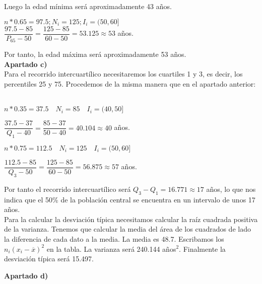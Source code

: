 Luego la edad mínima será aproximadamente 43 años.

\begin{center}
	$n*0.65 = 97.5; N_i = 125 ; I_i = (50, 60]$\\
	$\dfrac{97.5-85}{P_{65}-50} = \dfrac{125-85}{60-50} = 53.125
	\approx 53$ años.
\end{center}

Por tanto, la edad máxima será aproximadamente 53 años.\\


\textbf{Apartado c)}\\

Para el recorrido intercuartílico necesitaremos los cuartiles 1 y 3, es decir, los percentiles 25 y 75. Procedemos de la misma manera que en el apartado anterior:\\ \\ 

\begin{center}
	$n*0.35 = 37.5\quad  N_i = 85\quad  I_i = (40, 50]$\\
\end{center}

\begin{center}
	$\dfrac{37.5-37}{Q_{1}-40} = \dfrac{85-37}{50-40} = 40.104
	\approx 40$ años.
\end{center}

\begin{center}
	$n*0.75 = 112.5\quad  N_i = 125 \quad  I_i = (50, 60]$\\
	
\end{center}

\begin{center}
	$\dfrac{112.5-85}{Q_{3}-50} = \dfrac{125-85}{60-50} = 56.875
	\approx 57$ años.
\end{center}

Por tanto el recorrido intercuartílico será $Q_3-Q_1 = 16.771 \approx 17$ años, lo que nos indica que el 50\% de la población central se encuentra en un intervalo de unos 17 años.\\

Para la calcular la desviación típica necesitamos calcular la raíz cuadrada positiva de la varianza. Tenemos que calcular la media del área de los cuadrados de lado la diferencia de cada dato a la media. La media es 48.7. Escribamos los $n_i(x_i-\overline{x})^2$ en la tabla. La varianza será 240.144 años$^2$. Finalmente la desviación típica será 15.497.


\textbf{Apartado d)}\\

